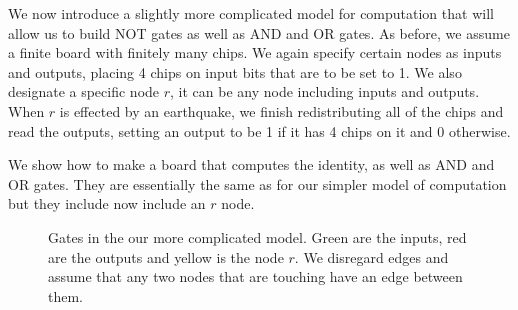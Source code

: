 \documentclass[runningheads,a4paper]{llncs}
\begin{document}

We now introduce a slightly more complicated model for computation that will allow us to build NOT gates as well as AND and OR gates. As before, we assume a finite board with finitely many chips. We again specify certain nodes as  inputs and outputs, placing 4 chips on input bits that are to be set to 1. We also designate a specific node $r$, it can be any node including inputs and outputs. When $r$ is effected by an earthquake, we finish redistributing all of the chips and read the outputs, setting an output to be 1 if it has 4 chips on it and 0 otherwise. 

We show how to make a board that computes the identity, as well as AND and OR gates. They are essentially the same as for our simpler model of computation but they include now include an $r$ node.

\begin{figure}
\centering
{}
\qquad\qquad
{}
\qquad\qquad
{}
\caption{Gates in the our more complicated model. Green are the inputs, red are the outputs and yellow is the node $r$. We disregard edges and assume that any two nodes that are touching have an edge between them.}
\label{fig:simplegateswithr}
\end{figure}
\end{document}
